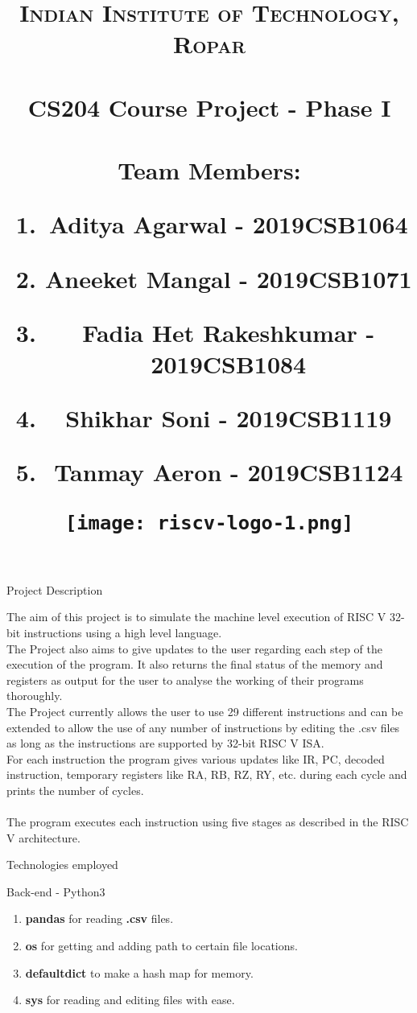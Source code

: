 \documentclass{article}
\title{ 
\normalfont \large 
\textsc{Indian Institute of Technology, Ropar} \\    [40pt] 
\horrule{} \\[0.4cm] 
\Huge CS204 Course Project - Phase I\\ 
\horrule{} \\[0.5cm]
\protect\vspace{2.0cm}
\large
\textup{Team Members:}\\\vspace{1cm}
\begin{centering}
\begin{enumerate}
    \item Aditya Agarwal - 2019CSB1064
    \item Aneeket Mangal - 2019CSB1071
    \item Fadia Het Rakeshkumar - 2019CSB1084
    \item Shikhar Soni - 2019CSB1119
    \item Tanmay Aeron - 2019CSB1124
\end{enumerate}
\end{centering}
\date{}
\centering
\protect\vspace{4.0cm}
\texttt{[image: riscv-logo-1.png]}
}
\begin{document}
\maketitle
\newpage
\begin{centering}
\begin{Huge}
\textsf{Project Description}\\
\end{Huge}
\end{centering}
\protect\vspace{2.0cm}
\large
The aim of this project is to simulate the machine level execution of RISC V 32-bit instructions using a high level language.\\

The Project also aims to give updates to the user regarding each step of the execution of the program. It also returns the final status of the memory and registers as output for the user to analyse the working of their programs thoroughly.\\

The Project currently allows the user to use 29 different instructions and can be extended to allow the use of any number of instructions by editing the .csv files as long as the instructions are supported by 32-bit RISC V ISA.\\

 For each instruction the program gives various updates like IR, PC, decoded instruction, temporary registers like RA, RB, RZ, RY, etc. during each cycle and prints the number of cycles.\\\\
The program executes each instruction using five stages as described in the RISC V architecture.

\begin{centering}
\begin{Huge}
\vspace{2.0cm}
\textsf{Technologies employed}\\
\end{Huge}
\end{centering}
\protect\vspace{2.0cm}
\textbf{}
Back-end - Python3
\begin{enumerate}
  \item {\bf pandas} for reading {\bf .csv} files.
  \item {\bf os} for getting and adding path to certain file locations.
  \item {\bf defaultdict} to make a hash map for memory.
  \item {\bf sys} for reading and editing files with ease.
\end{enumerate}\\
\textbf{}
\end{document}
